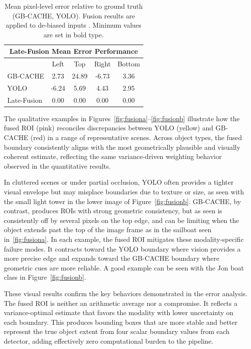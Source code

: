 \documentclass{erauthesis}
\begin{document}
\begin{table}[htpb]
\centering
\begin{tabular}{lcccc}
\hline
\multicolumn{5}{c}{Late-Fusion Mean Error Performance}\\
\hline
\hline
            & Left  & Top   & Right & Bottom \\
GB-CACHE    & 2.73 & 24.89 & -6.73 & 3.36   \\
YOLO        & -6.24 & 5.69  & 4.43  & 2.95 \\
Late-Fusion & $\mathbf{0.00}$ & $\mathbf{0.00}$  & $\mathbf{0.00}$ & $\mathbf{0.00}$  \\
\hline
\end{tabular}
\caption{Mean pixel-level error relative to ground truth (GB-CACHE, YOLO). Fusion results are applied to de-biased inputs .  Minimum values are set in bold type.}
\label{tab:fusion_mean_error}
\end{table}

The qualitative examples in Figures~\ref{fig:fusiona}–\ref{fig:fusionb} illustrate how the fused ROI (pink) reconciles discrepancies between YOLO (yellow) and GB-CACHE (red) in a range of representative scenes. Across object types, the fused boundary consistently aligns with the most geometrically plausible and visually coherent estimate, reflecting the same variance-driven weighting behavior observed in the quantitative results.

In cluttered scenes or under partial occlusion, YOLO often provides a tighter visual envelope but may misplace boundaries due to texture or size, as seen with the small light tower in the lower image of Figure~\ref{fig:fusionb}. GB-CACHE, by contrast, produces ROIs with strong geometric consistency, but as seen is consistently off by several pixels on the top edge, and can be limiting when the object extends past the top of the image frame as in the sailboat seen in~\ref{fig:fusiona}. In each example, the fused ROI mitigates these modality-specific failure modes. It contracts toward the YOLO boundary where vision provides a more precise edge and expands toward the GB-CACHE boundary where geometric cues are more reliable. A good example can be seen with the Jon boat class in Figure~\ref{fig:fusionb}.

These visual results confirm the key behaviors demonstrated in the error analysis. The fused ROI is neither an arithmetic average nor a compromise.
It reflects a variance-optimal estimate that favors the modality with lower uncertainty on each boundary. 
This produces bounding boxes that are more stable and better represent the true object extent from four scalar boundary values from each detector, adding effectively zero computational burden to the pipeline. 
\end{document}
